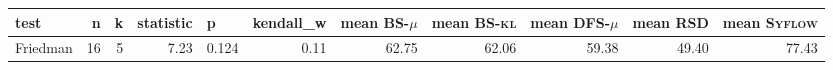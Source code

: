 \begin{tabular}{lrrrlrrrrrr}
\toprule
    test &  n &  k &  statistic &     p &  kendall\_w &  mean \textsc{BS-$\mu$} &  mean \textsc{BS-kl} &  mean \textsc{DFS-$\mu$} &  mean \textsc{RSD} &  mean \textsc{Syflow} \\
\midrule
Friedman & 16 &  5 &       7.23 & 0.124 &        0.11 &                   62.75 &                62.06 &                    59.38 &              49.40 &                 77.43 \\
\bottomrule
\end{tabular}
